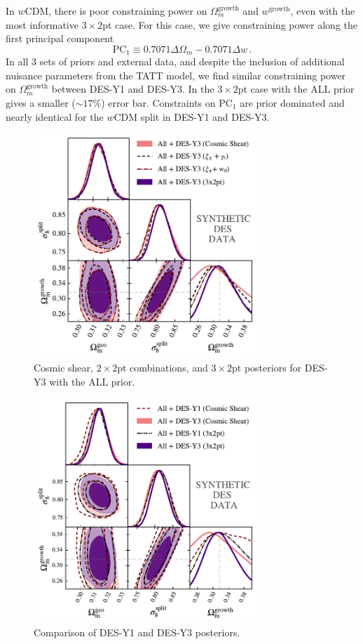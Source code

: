 In $w$CDM, there is poor constraining power on $\Omega_m^\mathrm{growth}$ and $w^{\mathrm{growth}}$, even with the most informative $3\times2$pt case. For this case, we give constraining power along the first principal component
\begin{equation}
	\mathrm{PC}_1 \equiv 0.7071\Delta\Omega_m - 0.7071\Delta w\,.
\end{equation}
In all 3 sets of priors and external data, and despite the inclusion of additional nuisance parameters from the TATT model, we find similar constraining power on $\Omega_m^\mathrm{growth}$ between DES-Y1 and DES-Y3. In the $3\times2$pt case with the ALL prior gives a smaller ($\sim17\%$) error bar. Constraints on $\mathrm{PC}_1$ are prior dominated and nearly identical for the $w$CDM split in DES-Y1 and DES-Y3.
\begin{figure}[ht]
	\centering
	\includegraphics[width=0.75\textwidth]{plots/plot36_S8.pdf}
	\caption{Cosmic shear, $2\times2$pt combinations, and $3\times2$pt posteriors for DES-Y3 with the ALL prior.}
	\label{fig:syn_y3_probe}
\end{figure}
\begin{figure}[ht]
	\centering
	\includegraphics[width=0.75\textwidth]{plots/plot31v3.pdf}
	\caption{Comparison of DES-Y1 and DES-Y3 posteriors.}
	\label{fig:syn_y1_y3}
\end{figure}
